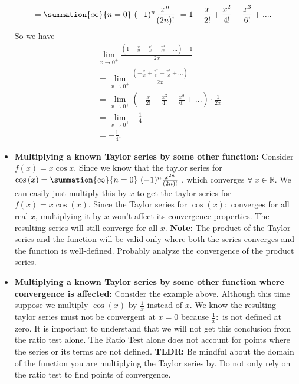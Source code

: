 \documentclass{report}
\begin{document}
\begin{itemize}
\begin{align*}
                                            &=\summation{\infty}{n=0}\ (-1)^{n}\frac{x^{n}}{(2n)!}\   = 1 - \frac{x}{2!} + \frac{x^{2}}{4!} - \frac{x^{3}}{6!} + ... 
                                        .\end{align*}
                                        So we have
                                        \begin{align*}
                    &\lim\limits_{x \to 0^{+}}{\frac{\left(1-\frac{x}{2!}+\frac{x^{2}}{4!}-\frac{x^{3}}{6!} + ...\right)-1}{2x}}\\
                    &=\lim\limits_{x \to 0^{+}}{\frac{\left(-\frac{x}{2!}+\frac{x^{2}}{4!}-\frac{x^{3}}{6!} + ...\right)}{2x}}\\
                    &=\lim\limits_{x \to 0^{+}}\left(-\frac{x}{2!}+\frac{x^{2}}{4!}-\frac{x^{3}}{6!} + ...\right)\cdot \frac{1}{2x}\\
                    &=\lim\limits_{x \to 0^{+}}{-\frac{1}{4}} \\
                    &=-\frac{1}{4}
                .\end{align*}
            \item \textbf{Multiplying a known Taylor series by some other function:} Consider $f(x) = x\cos{x}$. Since we know that the taylor series for $\cos{(x)} = \summation{\infty}{n=0}\ (-1)^{n}\frac{x^{2n}}{(2n)!}\ $, which converges $\forall\ x \in \mathbb{R} $. We can easily just multiply this by $x$ to get the taylor series for $f(x) = x\cos{(x)}$.  Since the Taylor series for $\cos{(x)}:$ converges for all real $x$, multiplying it by  $x$ won't affect its convergence properties. The resulting series will still converge for all $x$.
                \bigbreak \noindent 
                \textbf{Note:} The product of the Taylor series and the function will be valid only where both the series converges and the function is well-defined. Probably analyze the convergence of the product series.
            \item \textbf{Multiplying a known Taylor series by some other function where convergence is affected:} Consider the example above. Although this time suppose we multiply $\cos{(x)}$ by $\frac{1}{x} $ instead of $x$. We know the resulting taylor series must not be convergent at $x=0$ because $\frac{1}{x}:$ is not defined at zero. It is important to understand that we will not get this conclusion from the ratio test alone. The Ratio Test alone does not account for points where the series or its terms are not defined.
                \bigbreak \noindent 
                \textbf{TLDR:} Be mindful about the domain of the function you are multiplying the Taylor series by. Do not only rely on the ratio test to find points of convergence.

\end{itemize}
\end{document}
